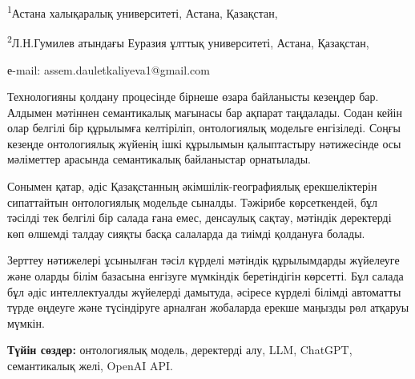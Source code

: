 \begin{affiliation}
\textsuperscript{1}Астана халықаралық университеті, Астана, Қазақстан,

\textsuperscript{2}Л.Н.Гумилев атындағы Еуразия ұлттық университеті, Астана, Қазақстан,

е-mail: assem.dauletkaliyeva1@gmail.com
\end{affiliation}

Технологияны қолдану процесінде бірнеше өзара байланысты кезеңдер бар.
Алдымен мәтіннен семантикалық мағынасы бар ақпарат таңдалады. Содан
кейін олар белгілі бір құрылымға келтіріліп, онтологиялық модельге
енгізіледі. Соңғы кезеңде онтологиялық жүйенің ішкі құрылымын
қалыптастыру нәтижесінде осы мәліметтер арасында семантикалық
байланыстар орнатылады.

Сонымен қатар, әдіс Қазақстанның әкімшілік-географиялық ерекшеліктерін
сипаттайтын онтологиялық модельде сыналды. Тәжірибе көрсеткендей, бұл
тәсілді тек белгілі бір салада ғана емес, денсаулық сақтау, мәтіндік
деректерді көп өлшемді талдау сияқты басқа салаларда да тиімді қолдануға
болады.

Зерттеу нәтижелері ұсынылған тәсіл күрделі мәтіндік құрылымдарды
жүйелеуге және оларды білім базасына енгізуге мүмкіндік беретіндігін
көрсетті. Бұл салада бұл әдіс интеллектуалды жүйелерді дамытуда, әсіресе
күрделі білімді автоматты түрде өңдеуге және түсіндіруге арналған
жобаларда ерекше маңызды рөл атқаруы мүмкін.

{\bfseries Түйін сөздер:} онтологиялық модель, деректерді алу, LLM,
ChatGPT, семантикалық желі, OpenAI API.

